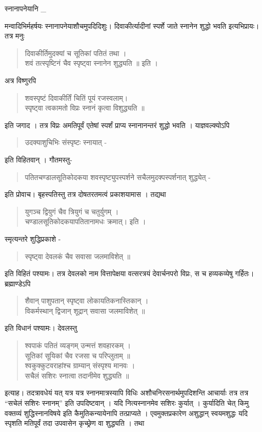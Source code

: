 स्नानापनेयानि \_

मन्वादिभिर्महर्षयः स्नानापनेयाशौचमुपदिदिशुः। दिवाकीर्त्यादीनां स्पर्शे जाते स्नानेन शुद्धो भवति इत्यभिप्रायः। तत्र मनुः 
\begin{verse}
दिवाकीर्तिमुदक्यां च सूतिकां पतितं तथा ।\\
शवं तत्स्पृष्टिनं चैव स्पृष्ट्वा स्नानेन शुद्ध्यति ॥ इति । 
\end{verse}
अत्र विष्णुरपि 
\begin{verse}
शवस्पृष्टं दिवाकीर्तिं चितिं पूयं रजस्वलाम्।\\
स्पृष्ट्वा त्वकामतो विप्रः स्नानं कृत्वा विशुद्ध्यति ॥ 
\end{verse}
इति जगाद । तत्र विप्रः अमतिपूर्वं एतेषां स्पर्शं प्राप्य स्नानानन्तरं शुद्धो भवति । याज्ञवल्क्योऽपि 
\begin{verse}
उदक्याशुचिभिः संस्पृष्टः स्नायात् -
\end{verse}
इति विहितवान् । गौतमस्तु- 
\begin{verse}
पतितचण्डालसूतिकोदकया शवस्पृष्ट्युपस्पर्शने सचैलमुदक्पस्पर्शनात्  शुद्ध्येत् -
\end{verse}
इति प्रोवाच। बृहस्पतिस्तु तत्र दोषतरतमत्वं प्रकाशयामास । तद्यथा 
\begin{verse}
युगञ्च द्वियुगं चैव त्रियुगं च चतुर्युगम् । \\
चण्डालसूतिकोदकयापतितानामधः क्रमात्। इति । 
\end{verse}
स्मृत्यन्तरे शुद्धिप्रकाशे - 
\begin{verse}
स्पृष्ट्वा देवलकं चैव सवासा जलमाविशेत् ॥
\end{verse}
इति विहितं पश्यामः। तत्र देवलको नाम वित्तापेक्षया वत्सरत्रयं देवार्चनपरो विप्रः, स च हव्यकव्येषु गर्हितः। ब्रह्माण्डेऽपि 
\begin{verse}
शैवान् पाशुपतान् स्पृष्ट्वा लोकायतिकनास्तिकान् ।\\
विकर्मस्थान् द्विजान् शूद्रान् सवासा जलमाविशेत्  ॥ 
\end{verse}
इति विधानं पश्यामः।  देवलस्तु 
\begin{verse}
श्वपाकं पतितं व्यङ्गम् उन्मत्तं शवहारकम् । \\
सूतिकां सूयिकां चैव रजसा च परिप्लुताम् ॥ \\
श्वकुक्कुटवराहांश्च ग्राम्यान् संस्पृश्य मानवः । \\
सचैलं सशिरः स्नात्वा तदानीमेव शुद्ध्यति ॥
\end{verse}
इत्याह। तदत्रावधेयं यत् यत्र यत्र स्नानमात्रस्यापि विधिः अशौचनिरसनार्थमुपदिशन्ति आचार्याः तत्र तत्र “सचेलं सशिरः स्नानम्” इति उपदिष्टवान् । यदि नित्यस्नानमेव सशिरः कुर्यात् । कुर्यादिति चेत् किमु वक्तव्यं शुद्धिस्नानविषये इति कैमुतिकन्यायेनापि तत्प्राप्यते । एवमुक्तप्रकारेण अशुद्धान् स्वयमशुद्धः यदि स्पृशति मतिपूर्वं तदा उपवासेन कृच्छ्रेण वा शुद्ध्यति । तथा 
